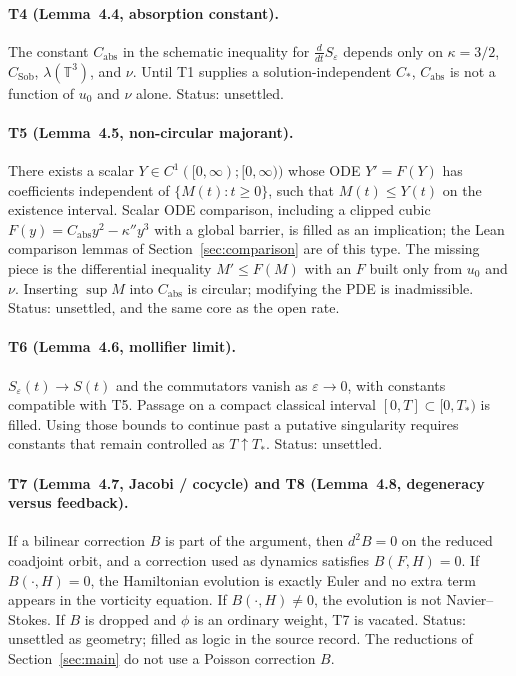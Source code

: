 \documentclass[11pt,a4paper]{article}
\theoremstyle{definition}
\theoremstyle{remark}
\newcommand{\T}{\mathbb{T}}
\begin{document}
\paragraph{T4 (Lemma~4.4, absorption constant).}
The constant $C_{\mathrm{abs}}$ in the schematic inequality for $\frac{d}{dt}S_{\varepsilon}$ depends only on $\kappa=3/2$, $C_{\mathrm{Sob}}$, $\lambda(\T^3)$, and $\nu$. Until T1 supplies a solution-independent $C_{\ast}$, $C_{\mathrm{abs}}$ is not a function of $u_0$ and $\nu$ alone. Status: unsettled.

\paragraph{T5 (Lemma~4.5, non-circular majorant).}
There exists a scalar $Y\in C^{1}([0,\infty);[0,\infty))$ whose ODE $Y'=F(Y)$ has coefficients independent of $\{M(t):t\ge 0\}$, such that $M(t)\le Y(t)$ on the existence interval. Scalar ODE comparison, including a clipped cubic $F(y)=C_{\mathrm{abs}}y^{2}-\kappa'' y^{3}$ with a global barrier, is filled as an implication; the Lean comparison lemmas of Section~\ref{sec:comparison} are of this type. The missing piece is the differential inequality $M'\le F(M)$ with an $F$ built only from $u_0$ and $\nu$. Inserting $\sup M$ into $C_{\mathrm{abs}}$ is circular; modifying the PDE is inadmissible. Status: unsettled, and the same core as the open rate.

\paragraph{T6 (Lemma~4.6, mollifier limit).}
$S_{\varepsilon}(t)\to S(t)$ and the commutators vanish as $\varepsilon\to 0$, with constants compatible with T5. Passage on a compact classical interval $[0,T]\subset[0,T_{\ast})$ is filled. Using those bounds to continue past a putative singularity requires constants that remain controlled as $T\uparrow T_{\ast}$. Status: unsettled.

\paragraph{T7 (Lemma~4.7, Jacobi / cocycle) and T8 (Lemma~4.8, degeneracy versus feedback).}
If a bilinear correction $B$ is part of the argument, then $d^{2}B=0$ on the reduced coadjoint orbit, and a correction used as dynamics satisfies $B(F,H)=0$. If $B(\cdot,H)=0$, the Hamiltonian evolution is exactly Euler and no extra term appears in the vorticity equation. If $B(\cdot,H)\neq 0$, the evolution is not Navier--Stokes. If $B$ is dropped and $\phi$ is an ordinary weight, T7 is vacated. Status: unsettled as geometry; filled as logic in the source record. The reductions of Section~\ref{sec:main} do not use a Poisson correction $B$.
\end{document}

